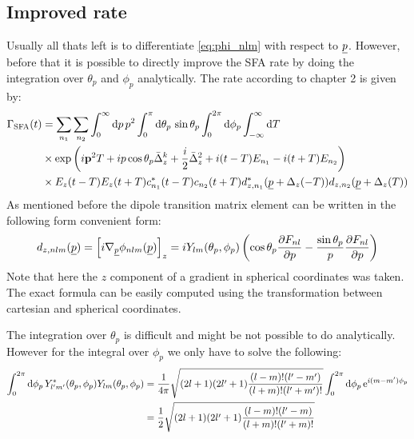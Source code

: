 \subsection*{Improved rate}
Usually all thats left is to differentiate \eqref{eq:phi_nlm} with respect to $\underline{p}$.
However, before that it is possible to directly improve the SFA rate by doing the integration over $\theta_p$ and $\phi_p$ analytically.
The rate according to chapter 2 is given by:
\begin{align*}
    \Gamma_{\mathrm{SFA}}(t) &= \sum_{n_1}\sum_{n_2} \int_0^{\infty} \mathrm{d} p\,p^2\int_0^{\pi} \mathrm{d}\theta_p\,\sin\theta_p \int_0^{2\pi}\mathrm{d} \phi_p\int_{-\infty}^{\infty} \mathrm{d} T\\
    &\times \exp\left(i\mathbf{p}^2T + ip\cos\theta_p\bar{\Delta}_z^k +  \frac{i}{2}\bar{\Delta}_z^2  + i(t-T)E_{n_1}-i(t+T)E_{n_2}\right)\\
    &\times E_z(t-T) E_z(t+T)c_{n_1}^*(t-T)c_{n_2}(t+T) d_{z,n_1}^*(\underline{p}+\Delta_z(-T))d_{z,n_2}(\underline{p}+\Delta_z(T))
\end{align*}
As mentioned before the dipole transition matrix element can be written in the following form convenient form:
\begin{equation*}
    d_{z,nlm}(\underline{p}) = \left[i\nabla_{\underline{p}}\phi_{nlm}(\underline{p})\right]_z = iY_{lm}(\theta_p, \phi_p)\left(\cos\theta_p\frac{\partial F_{nl}}{\partial p}-\frac{\sin\theta_p}{p}\frac{\partial F_{nl}}{\partial p}\right)
\end{equation*}
Note that here the $z$ component of a gradient in spherical coordinates was taken. The exact formula can be easily computed using the transformation between cartesian and spherical coordinates.

The integration over $\theta_p$ is difficult and might be not possible to do analytically.
However for the integral over $\phi_p$ we only have to solve the following:
\begin{align*}
    \int_{0}^{2\pi}\mathrm{d} \phi_p\, Y_{l'm'}^*(\theta_p, \phi_p) Y_{lm}(\theta_p, \phi_p) &= \frac{1}{4\pi}\sqrt{(2l+1)(2l'+1)\frac{(l-m)!(l'-m')}{(l+m)!(l'+m')!}}\int_{0}^{2\pi}\mathrm{d} \phi_p\, \mathrm{e}^{i(m-m')\phi_p}\\
    &= \frac{1}{2}\sqrt{(2l+1)(2l'+1)\frac{(l-m)!(l'-m)}{(l+m)!(l'+m)!}}
\end{align*}

